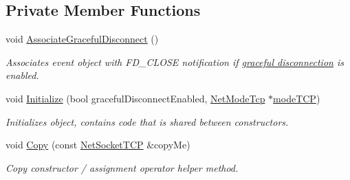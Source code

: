 \subsection*{Private Member Functions}
\begin{DoxyCompactItemize}
\item 
\hypertarget{class_net_socket_t_c_p_a39f8b4993f0995b1ee3c3f037870184d}{
void \hyperlink{class_net_socket_t_c_p_a39f8b4993f0995b1ee3c3f037870184d}{AssociateGracefulDisconnect} ()}
\label{class_net_socket_t_c_p_a39f8b4993f0995b1ee3c3f037870184d}

\begin{DoxyCompactList}\small\item\em Associates event object with FD\_\-CLOSE notification if \hyperlink{graceful_disconnect_page}{graceful disconnection} is enabled. \item\end{DoxyCompactList}\item 
void \hyperlink{class_net_socket_t_c_p_aa53e2b58c3330e5d8ea6a61942a3daf7}{Initialize} (bool gracefulDisconnectEnabled, \hyperlink{class_net_mode_tcp}{NetModeTcp} $\ast$\hyperlink{class_net_socket_t_c_p_aafcdf2d4234f269eab1c9d43955e99bc}{modeTCP})
\begin{DoxyCompactList}\small\item\em Initializes object, contains code that is shared between constructors. \item\end{DoxyCompactList}\item 
void \hyperlink{class_net_socket_t_c_p_a70bc18da8a63c5209f10e818cda8675b}{Copy} (const \hyperlink{class_net_socket_t_c_p}{NetSocketTCP} \&copyMe)
\begin{DoxyCompactList}\small\item\em Copy constructor / assignment operator helper method. \item\end{DoxyCompactList}\end{DoxyCompactItemize}
